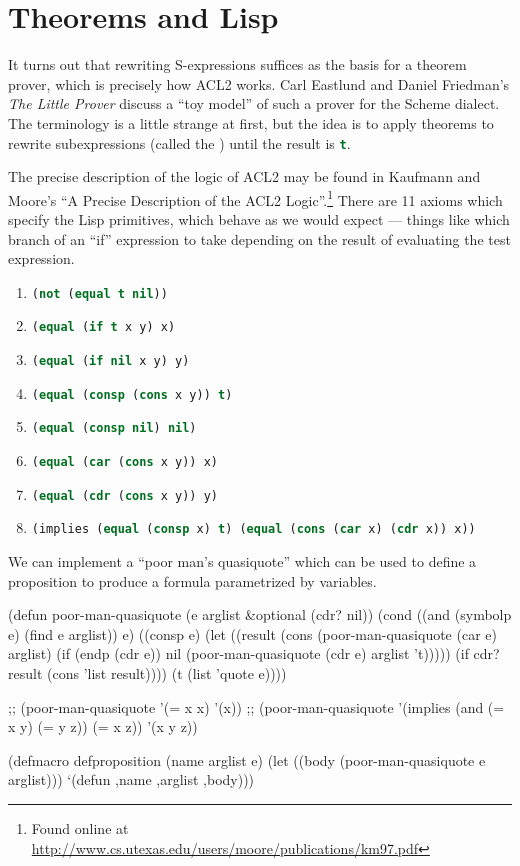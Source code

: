 \chapter{Theorems and Lisp}

\M
It turns out that rewriting S-expressions suffices as the basis for a
theorem prover, which is precisely how ACL2 works. Carl Eastlund and
Daniel Friedman's \textit{The Little Prover} discuss a ``toy model'' of
such a prover for the Scheme dialect. The terminology is a little
strange at first, but the idea is to apply theorems to rewrite
subexpressions (called the ) until the result is
\lstinline[language=lisp]{t}. 

\M The precise description of the logic of ACL2 may be found in Kaufmann
and Moore's ``A Precise Description of the ACL2 Logic''.\footnote{Found online at \url{http://www.cs.utexas.edu/users/moore/publications/km97.pdf}}
There are 11 axioms which specify the Lisp primitives, which behave as
we would expect --- things like which branch of an ``if'' expression to
take depending on the result of evaluating the test expression.

\begin{enumerate}
\item \lstinline[language=lisp]{(not (equal t nil))}
\item \lstinline[language=lisp]{(equal (if t x y) x)}
\item \lstinline[language=lisp]{(equal (if nil x y) y)}
\item \lstinline[language=lisp]{(equal (consp (cons x y)) t)}
\item \lstinline[language=lisp]{(equal (consp nil) nil)}
\item \lstinline[language=lisp]{(equal (car (cons x y)) x)}
\item \lstinline[language=lisp]{(equal (cdr (cons x y)) y)}
\item \lstinline[language=lisp]{(implies (equal (consp x) t) (equal (cons (car x) (cdr x)) x))}
\end{enumerate}

\M We can implement a ``poor man's quasiquote'' which can be used to
define a proposition to produce a formula parametrized by variables.

\begin{lisp-example}
(defun poor-man-quasiquote (e arglist &optional (cdr? nil))
  (cond
    ((and (symbolp e)
          (find e arglist)) e)
    ((consp e) (let ((result (cons (poor-man-quasiquote (car e) arglist)
                                   (if (endp (cdr e))
                                       nil
                                       (poor-man-quasiquote (cdr e) arglist 't)))))
                 (if cdr?
                     result
                     (cons 'list result))))
    (t (list 'quote e))))

;; (poor-man-quasiquote '(= x x) '(x))
;; (poor-man-quasiquote '(implies (and (= x y) (= y z)) (= x z)) '(x y z))

(defmacro defproposition (name arglist e)
  (let ((body (poor-man-quasiquote e arglist)))
    `(defun ,name ,arglist ,body)))
\end{lisp-example}
